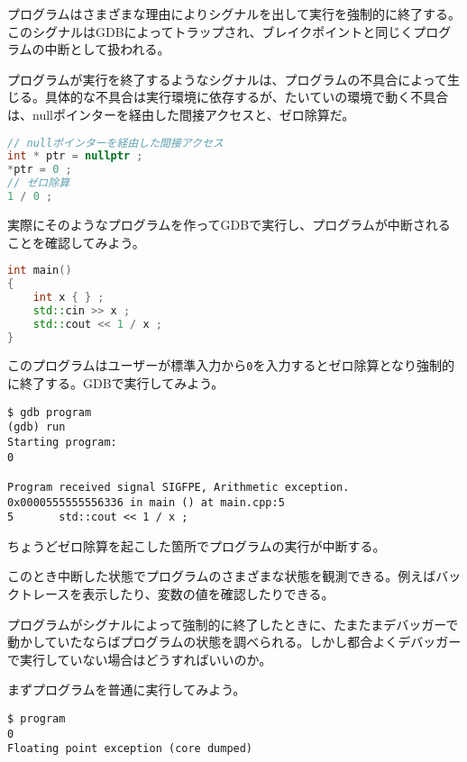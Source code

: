 
プログラムはさまざまな理由によりシグナルを出して実行を強制的に終了する。このシグナルはGDBによってトラップされ、ブレイクポイントと同じくプログラムの中断として扱われる。

プログラムが実行を終了するようなシグナルは、プログラムの不具合によって生じる。具体的な不具合は実行環境に依存するが、たいていの環境で動く不具合は、nullポインターを経由した間接アクセスと、ゼロ除算だ。

\begin{lstlisting}[language={C++}]
// nullポインターを経由した間接アクセス
int * ptr = nullptr ;
*ptr = 0 ;
// ゼロ除算
1 / 0 ;
\end{lstlisting}

実際にそのようなプログラムを作ってGDBで実行し、プログラムが中断されることを確認してみよう。

\begin{lstlisting}[language={C++}]
int main()
{
    int x { } ;
    std::cin >> x ;
    std::cout << 1 / x ;
}
\end{lstlisting}

このプログラムはユーザーが標準入力から\texttt{0}を入力するとゼロ除算となり強制的に終了する。GDBで実行してみよう。

\begin{lstlisting}[style=terminal]
$ gdb program
(gdb) run
Starting program:
0

Program received signal SIGFPE, Arithmetic exception.
0x0000555555556336 in main () at main.cpp:5
5       std::cout << 1 / x ;
\end{lstlisting}

ちょうどゼロ除算を起こした箇所でプログラムの実行が中断する。

このとき中断した状態でプログラムのさまざまな状態を観測できる。例えばバックトレースを表示したり、変数の値を確認したりできる。


プログラムがシグナルによって強制的に終了したときに、たまたまデバッガーで動かしていたならばプログラムの状態を調べられる。しかし都合よくデバッガーで実行していない場合はどうすればいいのか。

まずプログラムを普通に実行してみよう。

\begin{lstlisting}[style=terminal]
$ program
0
Floating point exception (core dumped)
\end{lstlisting}

